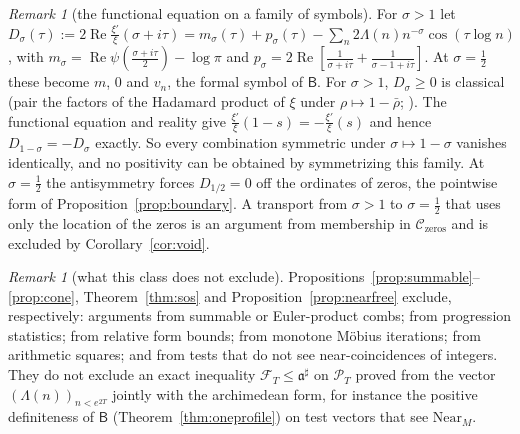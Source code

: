 \documentclass[11pt]{amsart}
\theoremstyle{definition}
\theoremstyle{remark}
\newtheorem{remark}[theorem]{Remark}
\newcommand{\Rel}{\operatorname{Re}}
\newcommand{\PT}{\mathcal P_T}
\begin{document}
\begin{remark}[the functional equation on a family of symbols]\label{rem:fe}
For $\sigma>1$ let $D_\sigma(\tau):=2\Rel\frac{\xi'}{\xi}(\sigma+i\tau)=m_\sigma(\tau)+p_\sigma(\tau)-\sum_n2\Lambda(n)n^{-\sigma}\cos(\tau\log n)$, with
$m_\sigma=\Rel\psi(\frac{\sigma+i\tau}2)-\log\pi$ and $p_\sigma=2\Rel[\frac1{\sigma+i\tau}+\frac1{\sigma-1+i\tau}]$. At $\sigma=\frac12$ these become $m$, $0$
and $v_n$, the formal symbol of $\mathsf B$. For $\sigma>1$, $D_\sigma\ge0$ is classical (pair the factors of the Hadamard product of $\xi$
under $\rho\mapsto1-\bar\rho$; \cite[Ch.~12]{Davenport2000}). The functional equation and reality give
$\frac{\xi'}{\xi}(1-s)=-\frac{\xi'}{\xi}(s)$ and hence $D_{1-\sigma}=-D_\sigma$ exactly. So every combination symmetric under $\sigma\mapsto1-\sigma$
vanishes identically, and no positivity can be obtained by symmetrizing this family. At $\sigma=\frac12$ the antisymmetry forces
$D_{1/2}=0$ off the ordinates of zeros, the pointwise form of Proposition~\ref{prop:boundary}. A transport from $\sigma>1$ to
$\sigma=\frac12$ that uses only the location of the zeros is an argument from membership in $\mathcal C_{\mathrm{zeros}}$ and is
excluded by Corollary~\ref{cor:void}.
\end{remark}

\begin{remark}[what this class does not exclude]\label{rem:bar-arith}
Propositions~\ref{prop:summable}--\ref{prop:cone}, Theorem~\ref{thm:sos} and Proposition~\ref{prop:nearfree} exclude, respectively:
arguments from summable or Euler-product combs; from progression statistics; from relative form bounds; from monotone M\"obius
iterations; from arithmetic squares; and from tests that do not see near-coincidences of integers. They do not exclude an exact
inequality $\mathcal F_T\le\mathfrak a^\sharp$ on $\PT$ proved from the vector $(\Lambda(n))_{n<e^{2T}}$ jointly with the archimedean form,
for instance the positive definiteness of $\mathsf B$ (Theorem~\ref{thm:oneprofile}) on test vectors that see $\mathrm{Near}_M$.
\end{remark}
\end{document}
